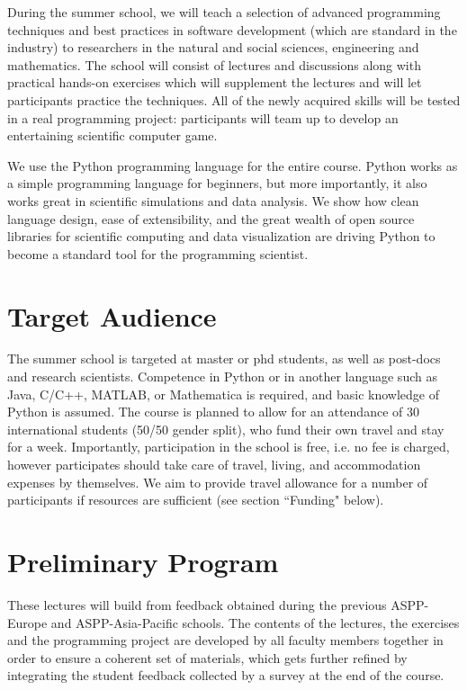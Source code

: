 \documentclass{article}[11pt]
\begin{document}
During the summer school, we will teach a selection of advanced programming
techniques and best practices in software development (which are standard in
the industry) to researchers in the natural and social sciences, engineering
and mathematics. The school will  consist of lectures and discussions along
with practical hands-on exercises which will supplement the lectures and will
let participants practice the techniques. All of the newly acquired skills will
be tested in a real programming project: participants will team up to develop
an entertaining scientific computer game.

We use the Python programming language for the entire course. Python works as a
simple programming language for beginners, but more importantly, it also works
great in scientific simulations and data analysis. We show how clean language
design, ease of extensibility, and the great wealth of open source libraries
for scientific computing and data visualization are driving Python to become a
standard tool for the programming scientist.

\section*{Target Audience}
The summer school is targeted at master or phd students, as well as post-docs
and research scientists. Competence in Python or in another language such as
Java, C/C++, MATLAB, or Mathematica is required, and basic knowledge of Python
is assumed. The course is planned to allow for an attendance of 30
international students (50/50 gender split), who fund their own travel and stay
for a week. Importantly, participation in the school is free, i.e. no fee is
charged, however participates should take care of travel, living, and
accommodation expenses by themselves. We aim to provide travel allowance for a
number of participants if resources are sufficient (see section ``Funding"
below).

\section*{Preliminary Program}
These lectures will build from feedback obtained during the previous ASPP-
Europe and ASPP-Asia-Pacific schools. The contents of the lectures, the
exercises and the programming project are developed by all faculty members
together in order to ensure a coherent set of materials, which gets further
refined by integrating the student feedback collected by a survey at the end of
the course.
\end{document}
